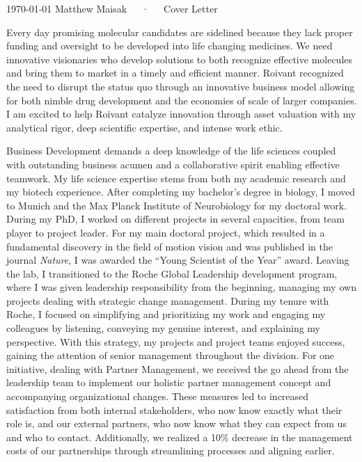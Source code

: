\documentclass[11pt, letterpaper]{awesome-cv}
\begin{document}
\makecvheader[R]

\makecvfooter
  {\today}
  {Matthew Maisak~~~·~~~Cover Letter}
  {}

\makelettertitle

\begin{cvletter}

Every day promising molecular candidates are sidelined because they lack proper funding and oversight to be developed into life changing medicines. We need innovative visionaries who develop solutions to both recognize effective molecules and bring them to market in a timely and efficient manner. Roivant recognized the need to disrupt the status quo through an innovative business model allowing for both nimble drug development and the economies of scale of larger companies. I am excited to help Roivant catalyze innovation through asset valuation with my analytical rigor, deep scientific expertise, and intense work ethic.

Business Development demands a deep knowledge of the life sciences coupled with outstanding business acumen and a collaborative spirit enabling effective teamwork. My life science expertise stems from both my academic research and my biotech experience. After completing my bachelor’s degree in biology, I moved to Munich and the Max Planck Institute of Neurobiology for my doctoral work. During my PhD, I worked on different projects in several capacities, from team player to project leader. For my main doctoral project, which resulted in a fundamental discovery in the field of motion vision and was published in the journal \textit{Nature}, I was awarded the “Young Scientist of the Year” award. Leaving the lab, I transitioned to the Roche Global Leadership development program, where I was given leadership responsibility from the beginning, managing my own projects dealing with strategic change management. During my tenure with Roche, I focused on simplifying and prioritizing my work and engaging my colleagues by listening, conveying my genuine interest, and explaining my perspective.  With this strategy, my projects and project teams enjoyed success, gaining the attention of senior management throughout the division. For one initiative, dealing with Partner Management, we received the go ahead from the leadership team to implement our holistic partner management concept and accompanying organizational changes. These measures led to increased satisfaction from both internal stakeholders, who now know exactly what their role is, and our external partners, who now know what they can expect from us and who to contact. Additionally, we realized a 10\% decrease in the management costs of our partnerships through streamlining processes and aligning earlier. 


\end{cvletter}
\end{document}
